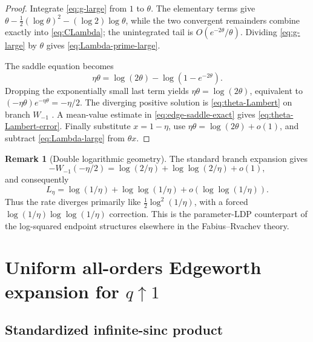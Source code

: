 \documentclass[11pt,a4paper]{article}
\theoremstyle{definition}
\newtheorem{remark}[theorem]{Remark}
\newcommand{\1}{\mathbf{1}}
\begin{document}
\begin{proof}
Integrate \eqref{eq:g-large} from $1$ to $\theta$.  The elementary terms give
$\theta-\frac12(\log\theta)^2-(\log2)\log\theta$, while the two convergent
remainders combine exactly into \eqref{eq:CLambda}; the unintegrated tail is
$O(e^{-2\theta}/\theta)$.  Dividing \eqref{eq:g-large} by $\theta$ gives
\eqref{eq:Lambda-prime-large}.

The saddle equation becomes
\begin{equation}
 \eta\theta=\log(2\theta)-\log(1-e^{-2\theta}).
 \label{eq:edge-saddle-exact}
\end{equation}
Dropping the exponentially small last term yields
$\eta\theta=\log(2\theta)$, equivalent to
$(-\eta\theta)e^{-\eta\theta}=-\eta/2$.  The diverging positive solution is
\eqref{eq:theta-Lambert} on branch $W_{-1}$ \cite{Corless1996}.  A mean-value estimate in
\eqref{eq:edge-saddle-exact} gives \eqref{eq:theta-Lambert-error}.  Finally
substitute $x=1-\eta$, use
$\eta\theta=\log(2\theta)+o(1)$, and subtract \eqref{eq:Lambda-large} from
$\theta x$.
\end{proof}

\begin{remark}[Double logarithmic geometry]
The standard branch expansion gives
\[
 -W_{-1}(-\eta/2)
 =\log(2/\eta)+\log\log(2/\eta)+o(1),
\]
and consequently
\[
 L_\eta=\log(1/\eta)+\log\log(1/\eta)
 +o(\log\log(1/\eta)).
\]
Thus the rate diverges primarily like $\tfrac12\log^2(1/\eta)$,
with a forced $\log(1/\eta)\log\log(1/\eta)$ correction.  This is the parameter-LDP
counterpart of the log-squared endpoint structures elsewhere in the
Fabius--Rvachev theory.
\end{remark}

\section{Uniform all-orders Edgeworth expansion for \texorpdfstring{$q\uparrow1$}{q tends to 1}}
\label{sec:Edgeworth}

\subsection{Standardized infinite-sinc product}
\end{document}
